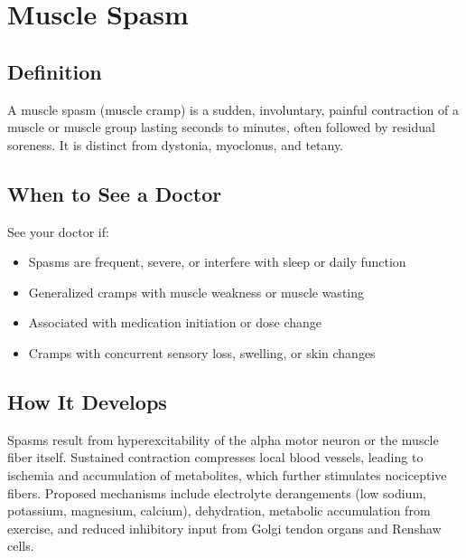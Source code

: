 \chapter{Muscle Spasm}

\section*{Definition}
A muscle spasm (muscle cramp) is a sudden, involuntary, painful contraction of a muscle or muscle group lasting seconds to minutes, often followed by residual soreness. It is distinct from dystonia, myoclonus, and tetany.

\section*{When to See a Doctor}
See your doctor if:
\begin{itemize}
  \item Spasms are frequent, severe, or interfere with sleep or daily function
  \item Generalized cramps with muscle weakness or muscle wasting
  \item Associated with medication initiation or dose change
  \item Cramps with concurrent sensory loss, swelling, or skin changes
\end{itemize}

\section*{How It Develops}
Spasms result from hyperexcitability of the alpha motor neuron or the muscle fiber itself. Sustained contraction compresses local blood vessels, leading to ischemia and accumulation of metabolites, which further stimulates nociceptive fibers. Proposed mechanisms include electrolyte derangements (low sodium, potassium, magnesium, calcium), dehydration, metabolic accumulation from exercise, and reduced inhibitory input from Golgi tendon organs and Renshaw cells.

